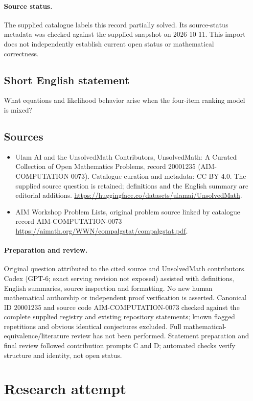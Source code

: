 \documentclass[11pt]{article}
\begin{document}
\paragraph{Source status.}
The supplied catalogue labels this record partially solved. Its source-status metadata was checked against the supplied snapshot on 2026-10-11. This import does not independently establish current open status or mathematical correctness.
\subsection{Short English statement}
What equations and likelihood behavior arise when the four-item ranking model is mixed?
\subsection{Sources}
\begin{itemize}
\item[S1] Ulam AI and the UnsolvedMath Contributors, UnsolvedMath: A Curated Collection of Open Mathematics Problems, record 20001235 (AIM-COMPUTATION-0073). Catalogue curation and metadata: CC BY 4.0. The supplied source question is retained; definitions and the English summary are editorial additions.
\url{https://huggingface.co/datasets/ulamai/UnsolvedMath}.
\item[S2] AIM Workshop Problem Lists, original problem source linked by catalogue record AIM-COMPUTATION-0073
\url{https://aimath.org/WWN/compalgstat/compalgstat.pdf}.
\end{itemize}
\paragraph{Preparation and review.}
Original question attributed to the cited source and UnsolvedMath contributors. Codex (GPT-6; exact serving revision not exposed) assisted with definitions, English summaries, source inspection and formatting. No new human mathematical authorship or independent proof verification is asserted. Canonical ID 20001235 and source code AIM-COMPUTATION-0073 checked against the complete supplied registry and existing repository statements; known flagged repetitions and obvious identical conjectures excluded. Full mathematical-equivalence/literature review has not been performed. Statement preparation and final review followed contribution prompts C and D; automated checks verify structure and identity, not open status.
\label{end:20001235}


\section{Research attempt}
\end{document}
